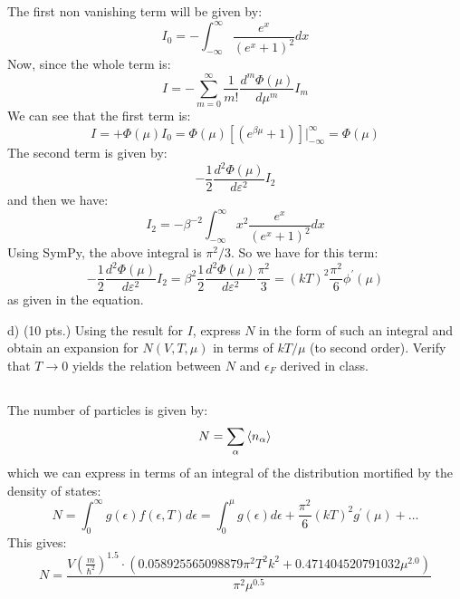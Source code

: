 \documentclass[12pt]{article}
\begin{document}
\subsection{}
The first non vanishing term will be given by:
\begin{equation}
  I_0 = -\int_{-\infty}^{\infty} \frac{e^{x}}{\left(e^{x} + 1\right)^2} dx
\end{equation}
Now, since the whole term is:
\begin{equation}
  I = -\sum_{m=0}^{\infty} \frac{1}{m!}\frac{d^m\Phi(\mu)}{d\mu^m} I_m
\end{equation}
We can see that the first term is:
\begin{equation}
  I = +\Phi(\mu) I_0 = \Phi(\mu)\left[(e^{\beta \mu} + 1)\right]|_{-\infty}^{\infty} = \Phi(\mu)
\end{equation}
The second term is given by:
\begin{equation}
   - \frac{1}{2} \frac{d^2\Phi(\mu)}{d\varepsilon ^2} I_2
\end{equation}  
and then we have:
\begin{equation}
  I_{2} = -\beta^{-2} \int_{-\infty}^{\infty} x^2 \frac{e^{x}}{\left(e^{x} + 1\right)^2} dx
\end{equation}
Using SymPy, the above integral is $\pi^2/3$. So we have for this term: 
\begin{equation}
  - \frac{1}{2} \frac{d^2\Phi(\mu)}{d\varepsilon ^2} I_2 = \beta ^{2} \frac{1}{2} \frac{d^2\Phi(\mu)}{d\varepsilon ^2} \frac{\pi^2}{3} = (kT)^2 \frac{\pi^2}{6} \phi ^{\prime}(\mu)
\end{equation}
as given in the equation.

d) (10 pts.) Using the result for $I$, express $N$ in the form of such an integral and obtain an expansion for $N(V, T, \mu)$ in terms of $k T / \mu$ (to second order). Verify that $T \rightarrow 0$ yields the relation between $N$ and $\epsilon_{F}$ derived in class.
\subsection{}
The number of particles is given by:
\begin{equation}
  N = \sum_{\alpha } \expval{n_{\alpha}}
\end{equation}
which we can express in terms of an integral of the distribution mortified by the density of states:
\begin{equation}
  N = \int_{0}^{\infty} g(\epsilon) f(\epsilon, T) d\epsilon = \int_{0}^{\mu } g(\epsilon) d\epsilon + \frac{\pi^2}{6} (kT)^2 g^{\prime}(\mu) + \ldots
\end{equation}
This gives:
\begin{equation}
  N = \frac{V \left(\frac{m}{\hbar^{2}}\right)^{1.5} \cdot \left(0.058925565098879 \pi^{2} T^{2} k^{2} + 0.471404520791032 \mu^{2.0}\right)}{\pi^{2} \mu^{0.5}}
\end{equation}
\end{document}

